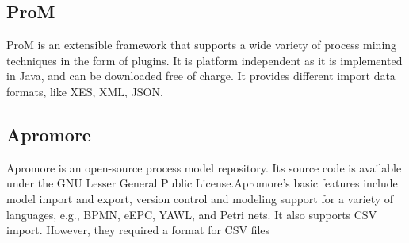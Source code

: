 \subsection{ProM}
ProM is an extensible framework that supports a wide variety of process mining techniques in the form of plugins. 
It is platform independent as it is implemented in Java, and can be downloaded free of charge. It provides different import data formats, like XES, XML, JSON.
\subsection{Apromore}
Apromore is an open-source process model repository. Its source code is available under the GNU Lesser General Public License.Apromore’s basic features include model import and export, version control and modeling support for a variety of languages, e.g., BPMN,
eEPC, YAWL, and Petri nets. It also supports CSV import. However, they required a format for CSV files 


\appendix

\appendix


